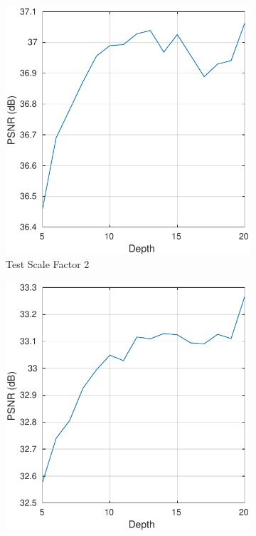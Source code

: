 \documentclass[10pt,twocolumn,letterpaper]{article}
\begin{document}
\begin{figure}[t]
\vspace{-.5cm}
	\centering
	\begin{subfigure}{0.25\textwidth}
		\includegraphics[width=\textwidth]{figs/depth_exp1}
		\caption{Test Scale Factor 2}
		\label{fig:gull}
	\end{subfigure}%
	\quad
	\begin{subfigure}{0.25\textwidth}
		\includegraphics[width=\textwidth]{figs/depth_exp2}

\end{subfigure}
\end{figure}
\end{document}
